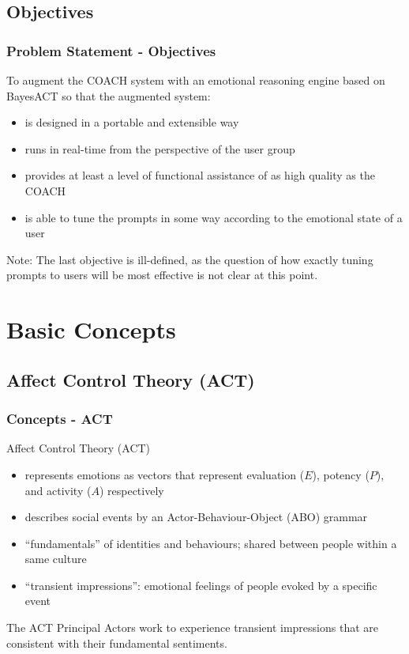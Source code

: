 \documentclass{beamer}
\begin{document}
\subsection{Objectives}
\begin{frame}
\frametitle{Problem Statement - Objectives}
To augment the COACH system with an emotional reasoning engine based on BayesACT so that the augmented system:\\
\begin{itemize}
\pause \item is designed in a portable and extensible way
\pause \item runs in real-time from the perspective of the user group
\pause \item provides at least a level of functional assistance of as high quality as the COACH
\pause \item is able to tune the prompts in some way according to the emotional state of a user
\end{itemize}
\vspace{0.3cm}
\pause Note: The last objective is ill-defined, as the question of how exactly tuning prompts to users will be most effective is not clear at this point.
\end{frame}

\section{Basic Concepts}
\subsection{Affect Control Theory (ACT)}
\begin{frame}
\frametitle{Concepts - ACT}
Affect Control Theory (ACT)
\begin{itemize}
\item represents emotions as vectors that represent evaluation ($E$), potency ($P$), and activity ($A$) respectively
\pause \item describes social events by an Actor-Behaviour-Object (ABO) grammar
\pause \item ``fundamentals'' of identities and behaviours; shared between people within a same culture
\pause \item ``transient impressions'': emotional feelings of people evoked by a specific event
\end{itemize}
\pause
\begin{block}{The ACT Principal}
Actors work to experience transient impressions that are consistent with their fundamental sentiments.
\end{block}
\end{frame}
\end{document}
